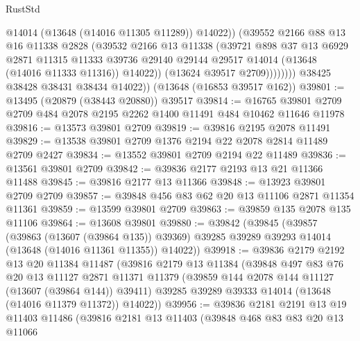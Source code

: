 \begin{lexlean}{RustStd}
\begin{coremodule}
                        @14014
                        (@13648 (@14016 @11305 @11289))
                        @14022))
                    (@39552
                      @2166
                      @88
                      @13
                      @16
                      @11338
                      @2828
                      (@39532
                        @2166
                        @13
                        @11338
                        (@39721
                          @898
                          @37
                          @13
                          @6929
                          @2871
                          @11315
                          @11333
                          @39736
                          @29140
                          @29144
                          @29517
                          @14014
                          (@13648 (@14016 @11333 @11316))
                          @14022))
                      (@13624 @39517 @2709))))))))
        @38425
        @38428
        @38431
        @38434
        @14022))
    (@13648 (@16853 @39517 @162))
@39801 := @13495 (@20879 (@38443 @20880)) @39517
@39814 := @16765 @39801 @2709 @2709 @484 @2078 @2195 @2262 @1400 @11491 @484 @10462 @11646 @11978
@39816 := @13573 @39801 @2709
@39819 := @39816 @2195 @2078 @11491
@39829 := @13538 @39801 @2709 @1376 @2194 @22 @2078 @2814 @11489 @2709 @2427
@39834 := @13552 @39801 @2709 @2194 @22 @11489
@39836 := @13561 @39801 @2709
@39842 := @39836 @2177 @2193 @13 @21 @11366 @11488
@39845 := @39816 @2177 @13 @11366
@39848 := @13923 @39801 @2709 @2709
@39857 := @39848 @456 @83 @62 @20 @13 @11106 @2871 @11354 @11361
@39859 := @13599 @39801 @2709
@39863 := @39859 @135 @2078 @135 @11106
@39864 := @13608 @39801
@39880 := @39842
    (@39845
      (@39857
        (@39863 (@13607 (@39864 @135)) @39369)
        @39285
        @39289
        @39293
        @14014
        (@13648 (@14016 @11361 @11355))
        @14022))
@39918 := @39836
    @2179
    @2192
    @13
    @20
    @11384
    @11487
    (@39816
      @2179
      @13
      @11384
      (@39848
        @497
        @83
        @76
        @20
        @13
        @11127
        @2871
        @11371
        @11379
        (@39859 @144 @2078 @144 @11127 (@13607 (@39864 @144)) @39411)
        @39285
        @39289
        @39333
        @14014
        (@13648 (@14016 @11379 @11372))
        @14022))
@39956 := @39836
    @2181
    @2191
    @13
    @19
    @11403
    @11486
    (@39816
      @2181
      @13
      @11403
      (@39848
        @468
        @83
        @83
        @20
        @13
        @11066

\end{coremodule}
\end{lexlean}
